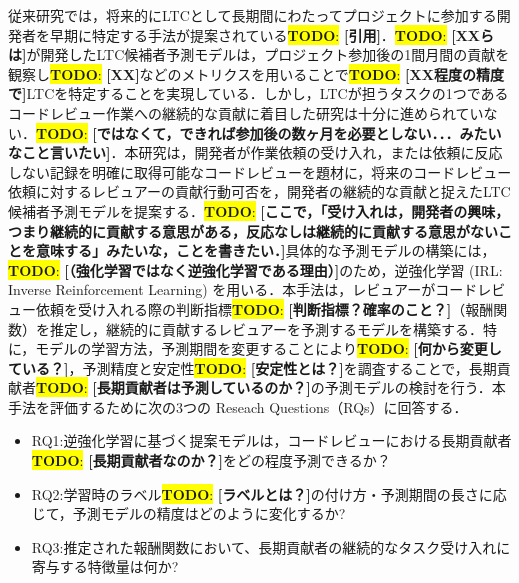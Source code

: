 \documentclass[submit,techrep,noauthor]{ipsj}
\newcommand{\todo}[1]{\colorbox{yellow}{{\bf TODO}:}{\color{red} {\textbf{[#1]}}}}
\begin{document}



従来研究では，将来的にLTCとして長期間にわたってプロジェクトに参加する開発者を早期に特定する手法が提案されている\todo{引用}．\todo{XXらは}が開発したLTC候補者予測モデルは，プロジェクト参加後の1間月間の貢献を観察し\todo{XX}などのメトリクスを用いることで\todo{XX程度の精度で}LTCを特定することを実現している．しかし，LTCが担うタスクの1つであるコードレビュー作業への継続的な貢献に着目した研究は十分に進められていない．\todo{ではなくて，できれば参加後の数ヶ月を必要としない．．．みたいなこと言いたい}．本研究は，開発者が作業依頼の受け入れ，または依頼に反応しない記録を明確に取得可能なコードレビューを題材に，将来のコードレビュー依頼に対するレビュアーの貢献行動可否を，開発者の継続的な貢献と捉えたLTC候補者予測モデルを提案する．\todo{ここで，「受け入れは，開発者の興味，つまり継続的に貢献する意思がある，反応なしは継続的に貢献する意思がないことを意味する」みたいな，ことを書きたい．}具体的な予測モデルの構築には，\todo{（強化学習ではなく逆強化学習である理由）}のため，逆強化学習 (IRL: Inverse Reinforcement Learning) を用いる．本手法は，レビュアーがコードレビュー依頼を受け入れる際の判断指標\todo{判断指標？確率のこと？}（報酬関数）を推定し，継続的に貢献するレビュアーを予測するモデルを構築する．特に，モデルの学習方法，予測期間を変更することにより\todo{何から変更している？}，予測精度と安定性\todo{安定性とは？}を調査することで，長期貢献者\todo{長期貢献者は予測しているのか？}の予測モデルの検討を行う．本手法を評価するために次の3つの Reseach Questions（RQs）に回答する．
\begin{itemize}
    \item RQ1:逆強化学習に基づく提案モデルは，コードレビューにおける長期貢献者\todo{長期貢献者なのか？}をどの程度予測できるか？
    \item RQ2:学習時のラベル\todo{ラベルとは？}の付け方・予測期間の長さに応じて，予測モデルの精度はどのように変化するか?
    \item RQ3:推定された報酬関数において、長期貢献者の継続的なタスク受け入れに寄与する特徴量は何か?
\end{itemize}
\end{document}
